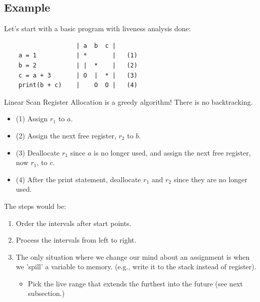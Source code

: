 \documentclass[10pt]{article}
\begin{document}
\subsection*{Example}
Let's start with a basic program with liveness analysis done:
\begin{verbatim}
                    | a  b  c |         
    a = 1           | *       |   (1)
    b = 2           | |  *    |   (2)
    c = a + 3       | O  |  * |   (3)
    print(b + c)    |    O  O |   (4)
\end{verbatim}
Linear Scan Register Allocation is a greedy algorithm!  There is no backtracking.
\begin{itemize}
    \item (1) Assign $r_1$ to $a$.
    \item (2) Assign the next free register, $r_2$ to $b$.
    \item (3) Deallocate $r_1$ since $a$ is no longer used, and assign the next free register, now $r_1$, to $c$.
    \item (4) After the print statement, deallocate $r_1$ and $r_2$ since they are no longer used.
\end{itemize}
The steps would be:
\begin{enumerate}
    \item Order the intervals after start points.
    \item Process the intervals from left to right.
    \item The only situation where we change our mind about an assignment is when we 'spill' a variable to memory.  (e.g., write it to the stack instead of register).
    \begin{itemize}
        \item Pick the live range that extends the furthest into the future (see next subsection.)
    \end{itemize}
\end{enumerate}

\pagebreak
\end{document}
